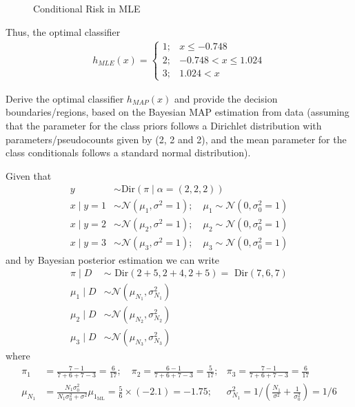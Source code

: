 \documentclass[solution,addpoints,12pt]{exam}
\begin{document}
\begin{questions}
\begin{parts}
\begin{subparts}
\begin{solution}
\begin{figure}[H]
{		}
		\caption{Conditional Risk in MLE}
		\label{fig:Risk_MLE}
	\end{figure}
	Thus, the optimal classifier 
	\begin{align*}
		h_{MLE} (x) = \left\{ \begin{array}{ll}
			1;& x\leq-0.748\\
			2;& -0.748<x\leq1.024\\
			3;& 1.024<x
			\end{array}
			\right.
	\end{align*}
\end{solution}

\subpart[4] Derive the optimal classifier $h_{MAP}(x)$ and provide the decision boundaries/regions, based on the Bayesian MAP estimation from data (assuming that the parameter for the class priors follows a Dirichlet distribution with parameters/pseudocounts given by (2, 2 and 2), and the mean parameter for the class conditionals follows a standard normal distribution).
\begin{solution}
	Given that 
	\begin{align*}
		y &\sim \text{Dir}\left(\pi\mid\alpha=(2,2,2)\right)\\
		x\mid y=1 &\sim \mathcal{N}(\mu_1,\sigma^2=1);\quad \mu_1\sim\mathcal{N}(0,\sigma_{0}^2=1)\\
		x\mid y=2 &\sim \mathcal{N}(\mu_2,\sigma^2=1);\quad \mu_2\sim\mathcal{N}(0,\sigma_{0}^2=1)\\
		x\mid y=3 &\sim \mathcal{N}(\mu_3,\sigma^2=1);\quad \mu_3\sim\mathcal{N}(0,\sigma_{0}^2=1)
	\end{align*}
	and by Bayesian posterior estimation we can write 
	\begin{align*}
		\pi\mid D&\sim\text{ Dir}(2+5,2+4,2+5)=\text{ Dir}(7,6,7)\\
		\mu_1\mid D&\sim \mathcal{N}(\mu_{N_1},\sigma_{N_1}^2)\\
		\mu_2\mid D&\sim \mathcal{N}(\mu_{N_2},\sigma_{N_2}^2)\\
		\mu_3\mid D&\sim \mathcal{N}(\mu_{N_3},\sigma_{N_3}^2)
	\end{align*}
	where
	\begin{align*}
		\pi_1& = \frac{7-1}{7+6+7-3}=\frac{6}{17};\quad\pi_2= \frac{6-1}{7+6+7-3}=\frac{5}{17}; &\pi_3=\frac{7-1}{7+6+7-3}=\frac{6}{17}\\
		\mu_{N_1}&=\frac{N_1\sigma_{0}^2}{N_1\sigma_{0}^2+\sigma^2}\mu_{1_{\text{ML}}}=\frac{5}{6}\times (-2.1)=-1.75;& \sigma_{N_1}^2 = 1/\left(\frac{N_1}{\sigma^2}+\frac{1}{\sigma_{0}^2}\right)=1/6\\

\end{align*}
\end{solution}
\end{subparts}
\end{parts}
\end{questions}
\end{document}
